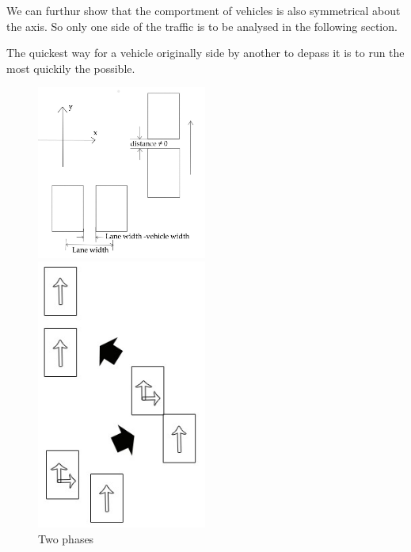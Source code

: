 \documentclass{mcmthesis}
\begin{document}
We can furthur show that the comportment of vehicles is also symmetrical about the axis. So only one side of the traffic is to be analysed in the following section.

\begin{Theorem} \label{thm:yingsongsheng2}
The quickest way for a vehicle originally side by another to depass it is to run the most quickily the possible.
\end{Theorem}

\begin{figure}[H]
	\begin{minipage}[h]{0.5\linewidth}
		\centering
		\includegraphics[width=2.2in]{Attachment-1.jpg}
	\end{minipage}
	\begin{minipage}[h]{0.5\linewidth}
		\centering
		\includegraphics[width=2.2in]{D.jpg}
		\caption{Two phases}
		\label{phase}
	\end{minipage}
\end{figure}
\end{document}
